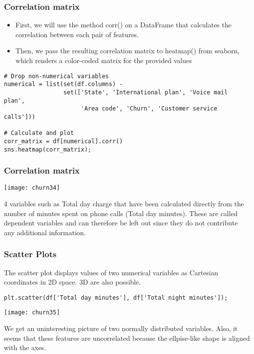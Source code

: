 \begin{frame}[fragile]\frametitle{Correlation matrix}
\begin{itemize}
\item First, we will use the method corr() on a DataFrame that calculates the correlation between each pair of features. 
\item Then, we pass the resulting correlation matrix to heatmap() from seaborn, which renders a color-coded matrix for the provided values
\end{itemize}
 \begin{lstlisting}
# Drop non-numerical variables
numerical = list(set(df.columns) - 
                 set(['State', 'International plan', 'Voice mail plan', 
                      'Area code', 'Churn', 'Customer service calls']))

# Calculate and plot
corr_matrix = df[numerical].corr()
sns.heatmap(corr_matrix);
\end{lstlisting}
\end{frame}

\begin{frame}[fragile]\frametitle{Correlation matrix}
\begin{center}
\texttt{[image: churn34]}
\end{center}
 4 variables such as Total day charge that have been calculated directly from the number of minutes spent on phone calls (Total day minutes). These are called dependent variables and can therefore be left out since they do not contribute any additional information.
 \end{frame}

\begin{frame}[fragile]\frametitle{Scatter Plots}
The scatter plot displays values of two numerical variables as Cartesian coordinates in 2D space. 3D are also possible.
 \begin{lstlisting}
plt.scatter(df['Total day minutes'], df['Total night minutes']);
\end{lstlisting}
\begin{center}
\texttt{[image: churn35]}
\end{center}
We get an uninteresting picture of two normally distributed variables. Also, it seems that these features are uncorrelated because the ellpise-like shape is aligned with the axes.
\end{frame}


